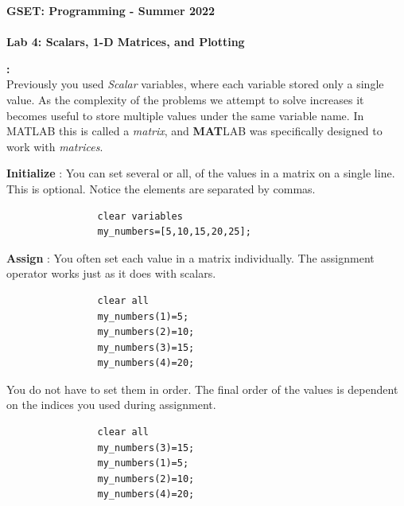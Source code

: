 \documentclass[11pt]{article}
\newcommand{\secNum}{GSET: Programming}
\newcommand{\assnType}{Lab}
\newcommand{\assnTitle}{Scalars, 1-D Matrices, and Plotting}
\newcommand{\assnNum}{4}
\newcommand{\currTerm}{Summer 2022}
\begin{document}
    \textbf{\LARGE \secNum \hspace{1mm} - \hspace{1mm} \currTerm} \\\\
    \textbf{\LARGE \assnType \hspace{1mm}  \assnNum : \assnTitle} 
		
	\begin{description}
	\vspace{5mm}
		\item [\textbf{ \Large Overview}] \textbf{ \Large :}\\
			Previously you used {\it Scalar} variables, where each variable stored only a single value. As the complexity of the problems we attempt to solve increases it becomes useful to store multiple values under the same variable name. In MATLAB this is called a {\it matrix}, and {\bf MAT}LAB was specifically designed to work with {\it matrices}.

        \begin{description}

            \item \textbf {Initialize} : You can set several or all, of the values in a matrix on a single line. This is optional. Notice the elements are separated by commas.
                \begin{verbatim}
                clear variables
                my_numbers=[5,10,15,20,25];
                \end{verbatim}
            \item \textbf {Assign} : You often set each value in a matrix individually. The assignment operator works just as it does with scalars.			
                \begin{verbatim}
                clear all
                my_numbers(1)=5;
                my_numbers(2)=10;
                my_numbers(3)=15;
                my_numbers(4)=20;		
                \end{verbatim}
            
            You do not have to set them in order. The final order of the values is dependent on the indices you used during assignment.
                \begin{verbatim}
                clear all
                my_numbers(3)=15;
                my_numbers(1)=5;
                my_numbers(2)=10;
                my_numbers(4)=20;			
                \end{verbatim}


\end{description}
\end{description}
\end{document}
